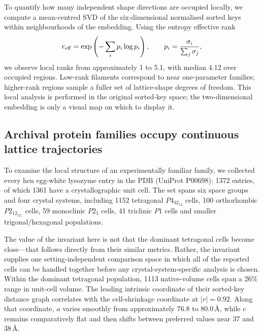 \documentclass[11pt]{article}
\newcommand{\Ang}{\text{\AA}}
\begin{document}
To quantify how many independent shape directions are occupied locally, we compute a mean-centred SVD of the six-dimensional normalised sorted keys within neighbourhoods of the embedding. Using the entropy effective rank
\begin{equation}
r_{\rm eff}=\exp\left(-\sum_i p_i\log p_i\right),\qquad p_i=\frac{\sigma_i}{\sum_j\sigma_j},
\end{equation}
we observe local ranks from approximately 1 to 5.1, with median 4.12 over occupied regions. Low-rank filaments correspond to near one-parameter families; higher-rank regions sample a fuller set of lattice-shape degrees of freedom. This local analysis is performed in the original sorted-key space; the two-dimensional embedding is only a visual map on which to display it.


\subsection{Archival protein families occupy continuous lattice trajectories}

To examine the local structure of an experimentally familiar family, we collected every hen egg-white lysozyme entry in the PDB (UniProt P00698): 1372 entries, of which 1361 have a crystallographic unit cell. The set spans six space groups and four crystal systems, including 1152 tetragonal $P4_32_12$ cells, 100 orthorhombic $P2_12_12_1$ cells, 59 monoclinic $P2_1$ cells, 41 triclinic $P1$ cells and smaller trigonal/hexagonal populations.

The value of the invariant here is not that the dominant tetragonal cells become close---that follows directly from their similar metrics. Rather, the invariant supplies one setting-independent comparison space in which all of the reported cells can be handled together before any crystal-system-specific analysis is chosen. Within the dominant tetragonal population, 1113 native-volume cells span a 26\% range in unit-cell volume. The leading intrinsic coordinate of their sorted-key distance graph correlates with the cell-shrinkage coordinate at $|r|=0.92$. Along that coordinate, $a$ varies smoothly from approximately $76.8$ to $80.0\,\Ang$, while $c$ remains comparatively flat and then shifts between preferred values near 37 and $38\,\Ang$.
\end{document}
